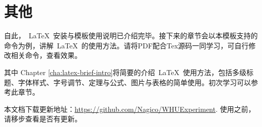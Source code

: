 \section{其他}

自此，~\LaTeX~安装与模板使用说明已介绍完毕。接下来的章节会以本模板支持的命令为例，讲解~\LaTeX~的使用方法。请将PDF配合Tex源码一同学习，可自行修改相关命令，查看效果。

其中 Chapter \ref{cha:latex-brief-intro}将简要的介绍~\LaTeX~使用方法，包括多级标题、字体样式、字号调节、定理与公式、图片与表格的简单使用。初次学习可以参考此章节。


 \vfill

本文档下载更新地址：\url{https://github.com/Nagico/WHUExperiment}. 使用之前，请移步查看是否有更新。